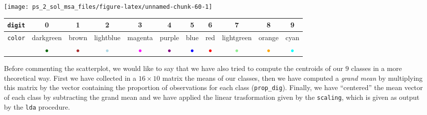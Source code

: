 \documentclass[
]{article}
\newenvironment{Shaded}{\begin{snugshade}}{\end{snugshade}}
\newcommand{\AttributeTok}[1]{\textcolor[rgb]{0.13,0.29,0.53}{#1}}
\newcommand{\ControlFlowTok}[1]{\textcolor[rgb]{0.13,0.29,0.53}{\textbf{#1}}}
\newcommand{\DecValTok}[1]{\textcolor[rgb]{0.00,0.00,0.81}{#1}}
\newcommand{\FunctionTok}[1]{\textcolor[rgb]{0.13,0.29,0.53}{\textbf{#1}}}
\newcommand{\NormalTok}[1]{#1}
\newcommand{\OtherTok}[1]{\textcolor[rgb]{0.56,0.35,0.01}{#1}}
\newcommand{\SpecialCharTok}[1]{\textcolor[rgb]{0.81,0.36,0.00}{\textbf{#1}}}
\theoremstyle{plain}
\begin{document}
\vspace{24pt}

\begin{Shaded}
\end{Shaded}

\vspace{-30pt}

\begin{center}\texttt{[image: ps\_2\_sol\_msa\_files/figure-latex/unnamed-chunk-60-1]} \end{center}

\begin{center}
    \begin{tabular}{ c | c c c c c c c c c c }
        \texttt{digit} & 0 & 1 & 2 & 3 & 4 & 5 & 6 & 7 & 8 & 9 \\
        \hline
        \multirow{2}{4em}{\texttt{color}} & \small{darkgreen} & \small{brown} & \small{lightblue} & \small{magenta} & \small{purple} & \small{blue} & \small{red} & \small{lightgreen} & \small{orange} & \small{cyan} \\ 
        & \textcolor{darkgreen}{$\bullet$} & \textcolor{brown}{$\bullet$} & \textcolor{lightblue}{$\bullet$} & \textcolor{magenta}{$\bullet$} & \textcolor{purple}{$\bullet$} & \textcolor{blue}{$\bullet$} & \textcolor{red}{$\bullet$} & \textcolor{lightgreen}{$\bullet$} & \textcolor{orange}{$\bullet$} & \textcolor{cyan}{$\bullet$} \\ 
    \end{tabular}
\end{center}

Before commenting the scatterplot, we would like to say that we have
also tried to compute the centroids of our \(9\) classes in a more
theoretical way. First we have collected in a \(16 \times 10\) matrix
the means of our classes, then we have computed a \textit{grand mean} by
multiplying this matrix by the vector containing the proportion of
observations for each class (\texttt{prop\_dig}). Finally, we have
``centered'' the mean vector of each class by subtracting the grand mean
and we have applied the linear trasformation given by the
\texttt{scaling}, which is given as output by the \texttt{lda}
procedure.
\end{document}

